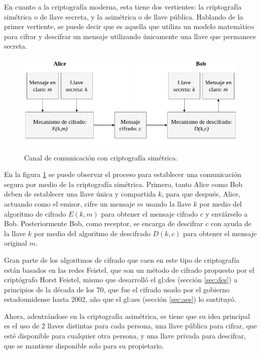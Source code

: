 En cuanto a la criptografía moderna, esta tiene dos vertientes: la
criptografía simétrica o de llave secreta, y la asimétrica o de llave
pública. Hablando de la primer vertiente, se puede decir que es aquella
que utiliza un modelo matemático para cifrar y descifrar un mensaje
utilizando únicamente una llave que permanece secreta.

\begin{figure}[H]
  \begin{center}
    \includegraphics[width=0.8\linewidth]{diagramas/cripto_simetrica.png}
    \caption{Canal de comunicación con criptografía simétrica.}
    \label{cripto_simetrica}
  \end{center}
\end{figure}

En la figura \ref{cripto_simetrica} se puede observar el proceso para
establecer una comunicación segura por medio de la criptografía simétrica.
Primero, tanto Alice como Bob deben de establecer una llave única y
compartida $k$, para que después, Alice, actuando como el emisor, cifre un
mensaje $m$ usando la llave $k$ por medio del algoritmo de cifrado $E(k,m)$
para obtener el mensaje cifrado $c$ y enviárselo a Bob. Posteriormente Bob,
como receptor, se encarga de descifrar $c$ con ayuda de la llave $k$ por
medio del algoritmo de descifrado $D(k,c)$ para obtener el mensaje original
$m$.

Gran parte de los algoritmos de cifrado que caen en este tipo de criptografía
están basados en las redes Feistel, que son un método de cifrado propuesto
por el criptógrafo Horst Feistel, mismo que desarrolló el \gls{gl:des} 
(sección \ref{sec:des}) a principios de la década de los 70, que fue el 
cifrado usado por el gobierno estadounidense hasta 2002, año que el 
\gls{gl:aes} (sección \ref{sec:aes}) lo sustituyó.

Ahora, adentrándose en la criptografía asimétrica, se tiene que su idea
principal es el uso de 2 llaves distintas para cada persona, una llave
pública para cifrar, que esté disponible para cualquier otra persona, y una
llave privada para descifrar, que se mantiene disponible solo para su
propietario.

